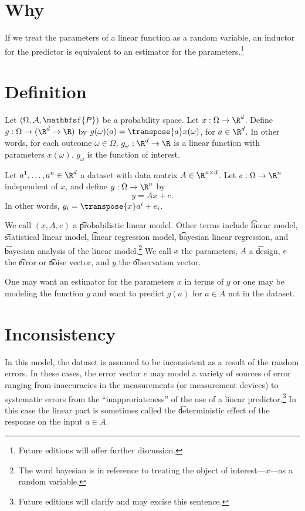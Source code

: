 

\section*{Why}

If we treat the parameters of a linear function as a random variable, an inductor for the predictor is equivalent to an estimator for the parameters.\footnote{Future editions will offer further discussion.}

\section*{Definition}

Let $(\Omega , \mathcal{A} , \mathbfsf{P} )$ be a probability space.
Let $x: \Omega  \to \R ^d$.
Define $g: \Omega  \to (\R ^d \to \R )$ by $g(\omega )(a) = \transpose{a}x(\omega )$, for $a \in \R ^d$.
In other words, for each outcome $\omega  \in \Omega $, $g_\omega : \R ^d \to \R $ is a linear function with parameters $x(\omega )$.
$g_\omega $ is the function of interest.

Let $a^1, \dots , a^n \in \R ^d$ a dataset with data matrix $A \in \R ^{n \times d}$.
Let $e: \Omega  \to \R ^n$ independent of $x$, and define $y: \Omega  \to \R ^n$ by
\[
y = Ax + e.
\]
In other words, $y_i = \transpose{x}a^i + e_i$.

We call $(x, A, e)$ a \t{probabilistic linear model}.
Other terms include \t{linear model}, \t{statistical linear model}, \t{linear regression model}, \t{bayesian linear regression}, and \t{bayesian analysis of the linear model}.\footnote{The word bayesian is in reference to treating the object of interest---$x$---as a random variable.}
We call $x$ the parameters, $A$ a \t{design}, $e$ the \t{error} or \t{noise} vector, and $y$ the \t{observation} vector.

One may want an estimator for the parameters $x$ in terms of $y$ or one may be modeling the function $g$ and want to predict $g(a)$ for $a \in A$ not in the dataset.

\section*{Inconsistency}

In this model, the dataset is assumed to be inconsistent as a result of the random errors.
In these cases, the error vector $e$ may model a variety of sources of error ranging from inaccuracies in the measurements (or measurement devices) to systematic errors from the ``inapproriateness'' of the use of a linear predictor.\footnote{Future editions will clarify and may excise this sentence.}
In this case the linear part is sometimes called the \t{deterministic effect} of the response on the input $a \in A$.

